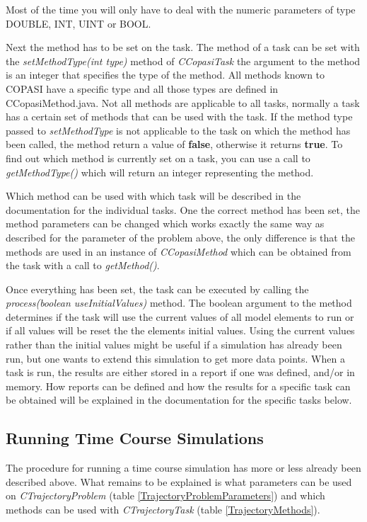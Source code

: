 \documentclass[a4,10pt]{article}
\begin{document}
Most of the time you will only have to deal with the numeric parameters of type DOUBLE, INT, UINT or BOOL.

Next the method has to be set on the task. The method of a task can be set with the \textit{setMethodType(int type)} method of \textit{CCopasiTask} the argument to the method is an integer that specifies the type of the method. All methods known to COPASI have a specific type and all those types are defined in CCopasiMethod.java. Not all methods are applicable to all tasks, normally a task has a certain set of methods that can be used with the task. If the method type passed to \textit{setMethodType} is not applicable to the task on which the method has been called, the method return a value of \textbf{false}, otherwise it returns \textbf{true}.
To find out which method is currently set on a task, you can use a call to \textit{getMethodType()} which will return an integer representing the method.

Which method can be used with which task will be described in the documentation for the individual tasks.
One the correct method has been set, the method parameters can be changed which works exactly the same way as described for the parameter of the problem above, the only difference is that the methods are used in an instance of \textit{CCopasiMethod} which can be obtained from the task with a call to \textit{getMethod()}.

Once everything has been set, the task can be executed by calling the \textit{process(boolean useInitialValues)} method. The boolean argument to the method determines if the task will use the current values of all model elements to run or if all values will be reset the the elements initial values. Using the current values rather than the initial values might be useful if a simulation has already been run, but one wants to extend this simulation to get more data points.
When a task is run, the results are either stored in a report if one was defined, and/or in memory. How reports can be defined and how the results for a specific task can be obtained will be explained in the documentation for the specific tasks below.


\subsection{Running Time Course Simulations}
The procedure for running a time course simulation has more or less already been described above. 
What remains to be explained is what parameters can be used on \textit{CTrajectoryProblem} (table \ref{TrajectoryProblemParameters}) and which methods can be used with \textit{CTrajectoryTask} (table \ref{TrajectoryMethods}).
\end{document}
